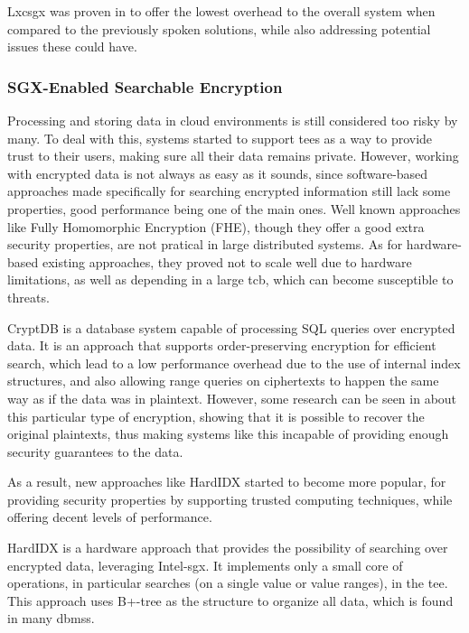 Lxcsgx was proven in \cite{lxcsgxPaper} to offer the lowest overhead to the overall system when compared to the previously spoken solutions, while also addressing potential issues these could have. 


\subsubsection{SGX-Enabled Searchable Encryption}
\label{sssec:sgxSearchEncrypt}


Processing and storing data in cloud environments is still considered too risky by many. To deal with this, systems started to support \gls{tee}s as a way to provide trust to their users, making sure all their data remains private. 
However, working with encrypted data is not always as easy as it sounds, since software-based approaches made specifically for searching encrypted information still lack some properties, good performance being one of the main ones. Well known approaches like Fully Homomorphic Encryption (FHE), though they offer a good extra security properties, are not pratical in large distributed systems. As for hardware-based existing approaches, they proved not to scale well due to hardware limitations, as well as depending in a large \gls{tcb}, which can become susceptible to threats.

CryptDB \cite{cryptDBPaper} is a database system capable of processing SQL queries over encrypted data. It is an approach that supports order-preserving encryption for efficient search, which lead to a low performance overhead due to the use of internal index structures, and also allowing range queries on ciphertexts to happen the same way as if the data was in plaintext. However, some research can be seen in \cite{naveedPaper} about this particular type of encryption, showing that it is possible to recover the original plaintexts, thus making systems like this incapable of providing enough security guarantees to the data.

As a result, new approaches like HardIDX started to become more popular, for providing security properties by supporting trusted computing techniques, while offering decent levels of performance.

HardIDX \cite{hardIDXPaper} is a hardware approach that provides the possibility of searching over encrypted data, leveraging Intel-\gls{sgx}. It implements only a small core of operations, in particular searches (on a single value or value ranges), in the \gls{tee}.
This approach uses B+-tree as the structure to organize all data, which is found in many \gls{dbms}s.

